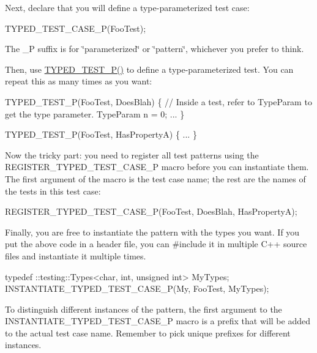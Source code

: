 Next, declare that you will define a type-\/parameterized test case\+:


\begin{DoxyCode}
TYPED\_TEST\_CASE\_P(FooTest);
\end{DoxyCode}


The {\ttfamily \+\_\+P} suffix is for \char`\"{}parameterized\char`\"{} or \char`\"{}pattern\char`\"{}, whichever you prefer to think.

Then, use {\ttfamily \hyperlink{gtest__list__tests__unittest___8cc_aadd51dfff9d63b5e0faa0130697684c1}{T\+Y\+P\+E\+D\+\_\+\+T\+E\+S\+T\+\_\+\+P()}} to define a type-\/parameterized test. You can repeat this as many times as you want\+:


\begin{DoxyCode}
TYPED\_TEST\_P(FooTest, DoesBlah) \{
  // Inside a test, refer to TypeParam to get the type parameter.
  TypeParam n = 0;
  ...
\}

TYPED\_TEST\_P(FooTest, HasPropertyA) \{ ... \}
\end{DoxyCode}


Now the tricky part\+: you need to register all test patterns using the {\ttfamily R\+E\+G\+I\+S\+T\+E\+R\+\_\+\+T\+Y\+P\+E\+D\+\_\+\+T\+E\+S\+T\+\_\+\+C\+A\+S\+E\+\_\+P} macro before you can instantiate them. The first argument of the macro is the test case name; the rest are the names of the tests in this test case\+:


\begin{DoxyCode}
REGISTER\_TYPED\_TEST\_CASE\_P(FooTest,
                           DoesBlah, HasPropertyA);
\end{DoxyCode}


Finally, you are free to instantiate the pattern with the types you want. If you put the above code in a header file, you can {\ttfamily \#include} it in multiple C++ source files and instantiate it multiple times.


\begin{DoxyCode}
typedef ::testing::Types<char, int, unsigned int> MyTypes;
INSTANTIATE\_TYPED\_TEST\_CASE\_P(My, FooTest, MyTypes);
\end{DoxyCode}


To distinguish different instances of the pattern, the first argument to the {\ttfamily I\+N\+S\+T\+A\+N\+T\+I\+A\+T\+E\+\_\+\+T\+Y\+P\+E\+D\+\_\+\+T\+E\+S\+T\+\_\+\+C\+A\+S\+E\+\_\+P} macro is a prefix that will be added to the actual test case name. Remember to pick unique prefixes for different instances.

